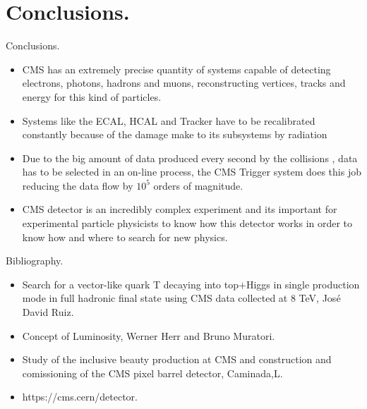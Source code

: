 \documentclass[8pt]{beamer}
\begin{document}
\section{Conclusions.}


\begin{frame}[fragile]{Conclusions.}

		\begin{itemize}
			\item CMS has an extremely precise quantity of systems capable of detecting electrons, photons, hadrons and muons, reconstructing vertices, tracks and energy for this kind of particles.
			\item Systems like the ECAL, HCAL and Tracker have to be recalibrated constantly because of the damage make to its subsystems by radiation 
			\item Due to the big amount of data produced every second by the collisions , data has to be selected in an on-line process, the CMS Trigger system does this job reducing the data flow by $10^5$ orders of magnitude. 
			\item CMS detector is an incredibly complex experiment and its important for experimental particle physicists to know how this detector works in order to know how and where to search for new physics.
		\end{itemize}
		
		
	
\end{frame}


\begin{frame}[fragile]{Bibliography.}
	
	\begin{itemize}
		\item Search for a vector-like quark T decaying
		into top$+$Higgs in single production mode
		in full hadronic final state using
		CMS data collected at 8 TeV, José David Ruiz.
		
		\item Concept of Luminosity, Werner Herr and Bruno Muratori.
		\item Study of the inclusive beauty production at CMS and construction and comissioning of the CMS pixel barrel detector, Caminada,L.
		\item https://cms.cern/detector.
	\end{itemize}
	
	
	
\end{frame}
\end{document}
